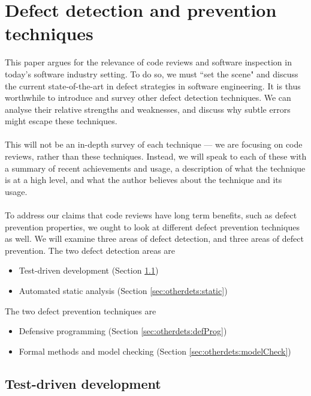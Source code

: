 \chapter{Defect detection and prevention techniques} \label{chap:otherdets}

This paper argues for the relevance of code reviews and software inspection in today's software
industry setting.
To do so, we must ``set the scene" and discuss the current state-of-the-art in defect strategies in
software engineering.
It is thus worthwhile to introduce and survey other defect detection techniques.
We can analyse their relative strengths and weaknesses, and discuss why subtle
errors might escape these techniques.\\
\\
This will not be an in-depth survey of each technique --- we are focusing on code reviews, rather
than these techniques.
Instead, we will speak to each of these with a summary of recent achievements and usage, a
description of what the technique is at a high level, and what the author believes about the
technique and its usage.\\
\\
To address our claims that code reviews have long term benefits, such as defect
prevention properties, we ought to look at different defect prevention
techniques as well.
We will examine three areas of defect detection, and three areas of defect
prevention.
The two defect detection areas are
\begin{itemize}
	\item Test-driven development (Section \ref{sec:otherdets:TDD})
	\item Automated static analysis (Section \ref{sec:otherdets:static})
\end{itemize}
The two defect prevention techniques are
\begin{itemize}
	\item Defensive programming (Section \ref{sec:otherdets:defProg})
	\item Formal methods and model checking (Section \ref{sec:otherdets:modelCheck})
\end{itemize}

\section{Test-driven development} \label{sec:otherdets:TDD}

